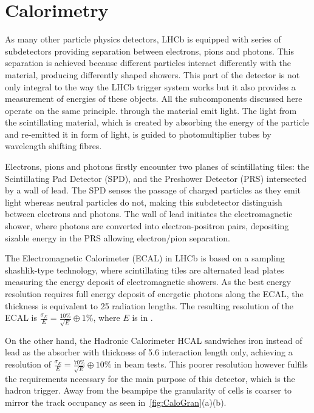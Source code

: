 \section{Calorimetry }
\label{calosys}
As many other particle physics detectors, \Gls{LHCb} is equipped with series of subdetectors providing separation between electrons, pions and photons. This separation is achieved because different particles interact differently with the material, producing differently shaped showers. This part of the detector is not only integral to the way the \Gls{LHCb} trigger system works but it also provides a measurement of \DIFaddbegin {}\DIFaddend energies of these objects.
All the subcomponents discussed here operate on the same principle. \DIFdelbegin {}\DIFdelend \DIFaddbegin {}\DIFaddend through the material emit light. The light from the scintillating material, which is created by absorbing the energy of the \DIFdelbegin {}\DIFdelend particle and re-emitted it in \DIFaddbegin {}\DIFaddend form of light, is guided to photomultiplier tubes by wavelength shifting fibres.

Electrons, pions and photons firstly encounter two planes of scintillating tiles: the Scintillating Pad Detector (\Gls{SPD}), and the Preshower Detector (\Gls{PRS}) intersected by a wall of lead. The \Gls{SPD} senses the passage of charged particles as they emit light whereas neutral particles do not, making this subdetector \DIFaddbegin {}\DIFaddend distinguish between electrons and photons. The wall of lead initiates the electromagnetic shower, where photons are converted into electron-positron pairs, depositing sizable energy in the \Gls{PRS} allowing electron/pion separation. 

The Electromagnetic Calorimeter (\Gls{ECAL}) in \gls{LHCb} is based on a sampling shashlik-type technology, where scintillating tiles are alternated \DIFdelbegin {}\DIFdelend \DIFaddbegin {}\DIFaddend lead plates measuring the energy deposit of electromagnetic showers. As the best energy resolution requires full energy deposit of energetic photons along the \Gls{ECAL}, the thickness is equivalent to 25 radiation lengths. The resulting resolution of the \Gls{ECAL} is $\frac{\sigma_{E}}{E} = \frac{10\%}{\sqrt{E}} \oplus 1\%$, where $E$ is in \gev.

On the other hand, the Hadronic Calorimeter \Gls{HCAL} sandwiches iron instead of lead as the absorber with \DIFaddbegin {}\DIFaddend thickness of 5.6 interaction length only, achieving a resolution of $\frac{\sigma_{E}}{E} = \frac{70\%}{\sqrt{E}} \oplus 10\%$ in beam tests. This poorer resolution however fulfils the requirements necessary for the main purpose of this detector, which is the hadron trigger. Away from the beampipe the granularity of cells is coarser to mirror the track occupancy as seen in~\autoref{fig:CaloGran}(a)(b). 

